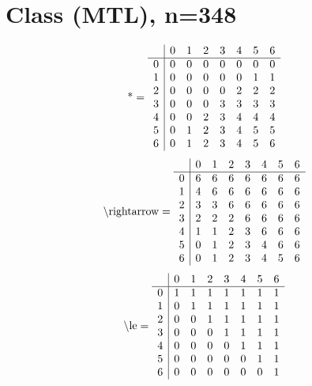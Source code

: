 \documentclass[11pt]{article}
\begin{document}
\section{Class (MTL), n=348}
\[\text{*} = 
\begin{array}{r | r r r r r r r}
 & 0 & 1 & 2 & 3 & 4 & 5 & 6 \\ \hline
0 & 0 & 0 & 0 & 0 & 0 & 0 & 0 \\
1 & 0 & 0 & 0 & 0 & 0 & 1 & 1 \\
2 & 0 & 0 & 0 & 0 & 2 & 2 & 2 \\
3 & 0 & 0 & 0 & 3 & 3 & 3 & 3 \\
4 & 0 & 0 & 2 & 3 & 4 & 4 & 4 \\
5 & 0 & 1 & 2 & 3 & 4 & 5 & 5 \\
6 & 0 & 1 & 2 & 3 & 4 & 5 & 6 \\
\end{array}
\]
\[\text{\textbackslash rightarrow} = 
\begin{array}{r | r r r r r r r}
 & 0 & 1 & 2 & 3 & 4 & 5 & 6 \\ \hline
0 & 6 & 6 & 6 & 6 & 6 & 6 & 6 \\
1 & 4 & 6 & 6 & 6 & 6 & 6 & 6 \\
2 & 3 & 3 & 6 & 6 & 6 & 6 & 6 \\
3 & 2 & 2 & 2 & 6 & 6 & 6 & 6 \\
4 & 1 & 1 & 2 & 3 & 6 & 6 & 6 \\
5 & 0 & 1 & 2 & 3 & 4 & 6 & 6 \\
6 & 0 & 1 & 2 & 3 & 4 & 5 & 6 \\
\end{array}
\]
\[\text{\textbackslash le} = 
\begin{array}{r | r r r r r r r}
 & 0 & 1 & 2 & 3 & 4 & 5 & 6 \\ \hline
0 & 1 & 1 & 1 & 1 & 1 & 1 & 1 \\
1 & 0 & 1 & 1 & 1 & 1 & 1 & 1 \\
2 & 0 & 0 & 1 & 1 & 1 & 1 & 1 \\
3 & 0 & 0 & 0 & 1 & 1 & 1 & 1 \\
4 & 0 & 0 & 0 & 0 & 1 & 1 & 1 \\
5 & 0 & 0 & 0 & 0 & 0 & 1 & 1 \\
6 & 0 & 0 & 0 & 0 & 0 & 0 & 1 \\
\end{array}
\]
\end{document}
